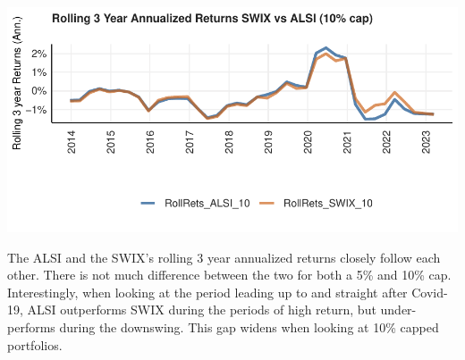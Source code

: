\documentclass[11pt,preprint, authoryear]{elsarticle}
\let\origfigure\figure
\let\endorigfigure\endfigure
\renewenvironment{figure}[1][2] {
    \expandafter\origfigure\expandafter[H]
} {
    \endorigfigure
}
\numberwithin{equation}{section}
\numberwithin{figure}{section}
\numberwithin{table}{section}
\begin{document}
\begin{figure}[H]

{\centering \includegraphics{Question3_files/figure-latex/Figure3-1} 

}

\caption{Rolling 3 Year Annualized Returns SWIX vs ALSI (10\% cap)}\label{fig:Figure3}
\end{figure}

The ALSI and the SWIX's rolling 3 year annualized returns closely follow
each other. There is not much difference between the two for both a 5\%
and 10\% cap. Interestingly, when looking at the period leading up to
and straight after Covid-19, ALSI outperforms SWIX during the periods of
high return, but under-performs during the downswing. This gap widens
when looking at 10\% capped portfolios.


\end{document}

